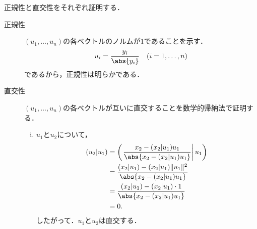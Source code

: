 \begin{tproof}
    正規性と直交性をそれぞれ証明する．
    \begin{description}
        \item[正規性] $(u_1, \ldots, u_n)$の各ベクトルのノルムが$1$であることを示す．
              \[
                  u_i = \frac{y_i}{\abs{y_i}} \quad (i = 1, \ldots, n)
              \]
              であるから，正規性は明らかである．
        \item[直交性] $(u_1, \ldots, u_n)$の各ベクトルが互いに直交することを数学的帰納法で証明する．
              \begin{enumerate}[(i)]
                  \item $u_1$と$u_2$について，
                        \begin{align*}
                            (u_2 | u_1) & = \left(\left. \frac{x_2 - (x_2 | u_1) u_1}{\abs{ x_2 - (x_2 | u_1) u_1 }} \right|u_1 \right) \\
                                        & = \frac{(x_2 | u_1) - (x_2 | u_1) \|u_1\|^2}{\abs{ x_2 - (x_2 | u_1) u_1 }}                   \\
                                        & = \frac{(x_2 | u_1) - (x_2 | u_1) \cdot 1}{\abs{ x_2 - (x_2 | u_1) u_1 }}                     \\
                                        & = 0.
                        \end{align*}
                        したがって．$u_1$と$u_2$は直交する．


\end{enumerate}
\end{description}
\end{tproof}

